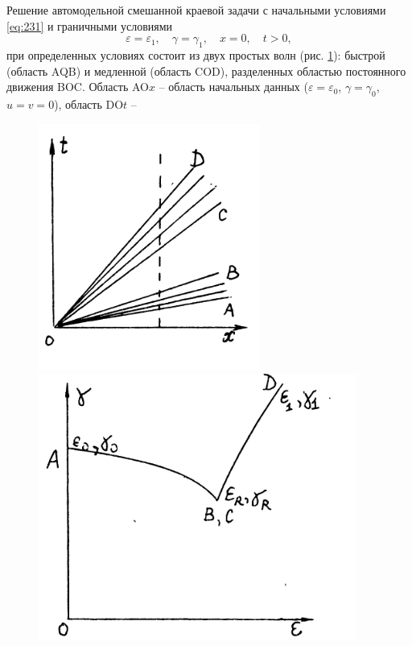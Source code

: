 \documentclass[specialist, subf, href, colorlinks=true, 14pt, final]{disser}
\theoremstyle{definition}
\begin{document}
Решение автомодельной смешанной краевой задачи с начальными условиями \eqref{eq:231} и граничными условиями
\[ 
  \varepsilon = \varepsilon_1, \quad \gamma = \gamma_1, \quad x = 0, \quad t > 0, 
\]
при определенных условиях состоит из двух простых волн (рис. \ref{2-3-2}): быстрой (область AQB) и медленной (область COD), разделенных областью постоянного движения BOC. Область AO$x$ -- область начальных данных ($\varepsilon = \varepsilon_{0}$, $\gamma = \gamma_0$, $u = v = 0$), область DO$t$ -- 
\begin{figure}[h]
\begin{center}
\begin{minipage}[h]{0.45\linewidth}
\includegraphics[width=1\linewidth]{pics/2-3-2.png}
\caption{}
\label{2-3-2}
\end{minipage}
\hfill
\begin{minipage}[h]{0.45\linewidth}
\includegraphics[width=1.1\linewidth]{pics/2-3-3.png}

\end{minipage}
\end{center}
\end{figure}
\end{document}
